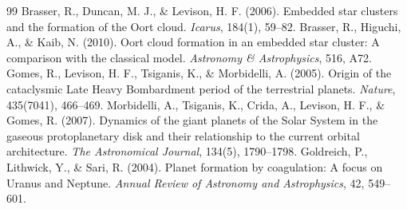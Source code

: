 \documentclass[11pt,a4paper]{article}
\begin{document}
\begin{thebibliography}{99}
 Brasser, R., Duncan, M. J., \& Levison, H. F. (2006). Embedded star clusters and the formation of the Oort cloud. \textit{Icarus}, 184(1), 59--82.
 Brasser, R., Higuchi, A., \& Kaib, N. (2010). Oort cloud formation in an embedded star cluster: A comparison with the classical model. \textit{Astronomy \& Astrophysics}, 516, A72.
 Gomes, R., Levison, H. F., Tsiganis, K., \& Morbidelli, A. (2005). Origin of the cataclysmic Late Heavy Bombardment period of the terrestrial planets. \textit{Nature}, 435(7041), 466--469.
 Morbidelli, A., Tsiganis, K., Crida, A., Levison, H. F., \& Gomes, R. (2007). Dynamics of the giant planets of the Solar System in the gaseous protoplanetary disk and their relationship to the current orbital architecture. \textit{The Astronomical Journal}, 134(5), 1790--1798.
 Goldreich, P., Lithwick, Y., \& Sari, R. (2004). Planet formation by coagulation: A focus on Uranus and Neptune. \textit{Annual Review of Astronomy and Astrophysics}, 42, 549--601.
\end{thebibliography}
\end{document}
